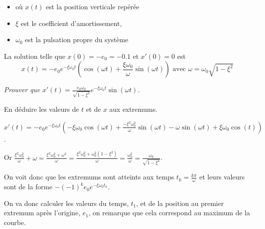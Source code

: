 \begin{itemize}
\item où $x(t)$ est la position verticale repérée
\item $\xi$ est le coefficient d'amortissement,
\item $\omega_0$ est la pulsation propre du système
\end{itemize}

La solution telle que $x(0) = -e_0 = -0.1$ et $x'(0) = 0$ est 
\[x(t) = -e_0e^{-\xi \omega_0 t}\left( \cos(\omega t)+\frac {\xi \omega_0}{\omega}\sin(\omega t)\right)\text{ avec }\omega = \omega_0 \sqrt{1-\xi^2} \]
\begin{Exercise}\it 
Prouver que $\displaystyle x'(t) = \frac{e_0\omega_0}{\sqrt{1-\xi^2}}e^{-\xi \omega_0 t}\sin(\omega t)$.

En déduire les valeurs de $t$ et de $x$ aux extremums.
\end{Exercise}
\begin{Answer}

$\displaystyle
x'(t) = -e_0e^{-\xi \omega_0 t}\left( -\xi \omega_0\cos(\omega t)+\frac {-\xi^2 \omega_0^2}{\omega}\sin(\omega t)
-\omega\sin(\omega t) + \xi \omega_0\cos(t)\right)$.

Or $\displaystyle \frac {\xi^2 \omega_0^2}{\omega}+\omega = \frac {\xi^2 \omega_0^2 +\omega^2}{\omega}
= \frac {\xi^2 \omega_0^2 +\omega_0^2(1-\xi^2)}{\omega}
= \frac {\omega_0^2}{\omega}
= \frac {\omega_0}{\sqrt{1-\xi^2}}$.

On voit donc que les extremums sont atteints aux temps $\displaystyle t_k = \frac{k\pi}{\omega}$ et leurs valeurs sont de la forme 
$-(-1)^ke_0 e^{-\xi \omega_0 t_k}$.
\end{Answer}
\medskip

On va donc calculer les valeurs du temps, $t_1$, et de la position au premier extremum après l'origine, $e_1$, on remarque que cela correspond au maximum de la courbe.

